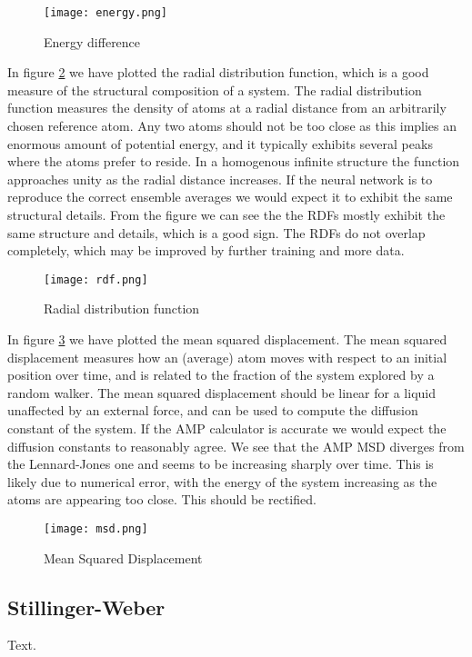 \begin{figure}[h]
    \centering
    \texttt{[image: energy.png]}
    \caption{Energy difference}
    \label{fig:energy}
\end{figure}

In figure \ref{fig:rdf} we have plotted the radial distribution function,
which is a good measure of the structural composition of a system.
The radial distribution function measures the density of atoms
at a radial distance from an arbitrarily chosen reference atom.
Any two atoms should not be too close as this implies an enormous
amount of potential energy, and it typically exhibits several
peaks where the atoms prefer to reside. In a homogenous infinite
structure the function approaches unity as the radial distance increases.
If the neural network is to reproduce the correct ensemble averages
we would expect it to exhibit the same structural details.
From the figure we can see the the RDFs mostly exhibit the same
structure and details, which is a good sign. The RDFs do not
overlap completely, which may be improved by further training and 
more data.

\begin{figure}[h]
    \centering
    \texttt{[image: rdf.png]}
    \caption{Radial distribution function}
    \label{fig:rdf}
\end{figure}

In figure \ref{fig:msd} we have plotted the mean squared displacement.
The mean squared displacement measures how an (average) atom
moves with respect to an initial position over time,
and is related to the fraction of the system explored by a random walker.
The mean squared displacement should be linear for a liquid
unaffected by an external force, and can be used to compute
the diffusion constant of the system. If the AMP calculator is accurate
we would expect the diffusion constants to reasonably agree.
We see that the AMP MSD diverges from the Lennard-Jones one
and seems to be increasing sharply over time. This is likely
due to numerical error, with the energy of the system increasing
as the atoms are appearing too close. This should be rectified.

\begin{figure}[h]
    \centering
    \texttt{[image: msd.png]}
    \caption{Mean Squared Displacement}
    \label{fig:msd}
\end{figure}

\subsection{Stillinger-Weber}
Text.
